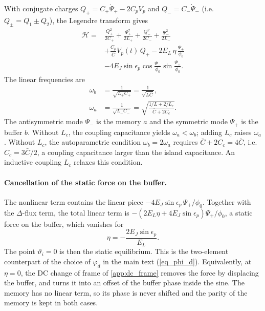 \documentclass[aps,prx,reprint,floatfix,amsmath,amssymb,longbibliography]{revtex4-2}
\begin{document}
With conjugate charges $Q_+=C_+\dot{\Psi}_+-2C_pV_p$ and
$Q_-=C_-\dot{\Psi}_-$ (i.e.\ $Q_\pm=Q_1\pm Q_2$), the Legendre transform
gives
\begin{equation}
\begin{aligned}
  \mathcal{H}={}&\frac{Q_+^2}{2C_+}+\frac{\Psi_+^2}{2L_+}
  +\frac{Q_-^2}{2C_-}+\frac{\Psi_-^2}{2L_-}\\
  &+\frac{C_p}{\bar{C}}V_p(t)\,Q_+
  -2E_L\,\eta\,\frac{\Psi_+}{\phi_0}\\
  &-4E_J\sin\epsilon_p\cos\frac{\Psi_-}{\phi_0}\sin\frac{\Psi_+}{\phi_0}.
\end{aligned}
\label{eq:app_H_bis}
\end{equation}
The linear frequencies are
\begin{equation}
\begin{aligned}
  \omega_b&=\frac{1}{\sqrt{L_+C_+}}=\frac{1}{\sqrt{L\bar{C}}},\\
  \omega_a&=\frac{1}{\sqrt{L_-C_-}}=\sqrt{\frac{1/L+2/L_c}{\bar{C}+2C_c}} .
\end{aligned}
\end{equation}
The antisymmetric mode $\Psi_-$ is the memory $a$ and the symmetric mode
$\Psi_+$ is the buffer $b$. Without $L_c$, the coupling capacitance
yields $\omega_a<\omega_b$; adding $L_c$ raises $\omega_a$. Without $L_c$,
the autoparametric condition $\omega_b=2\omega_a$ requires
$\bar{C}+2C_c=4\bar{C}$, i.e.\ $C_c=3\bar{C}/2$, a coupling capacitance
larger than the island capacitance. An inductive coupling $L_c$ relaxes
this condition.

\paragraph{Cancellation of the static force on the buffer.}
The nonlinear term contains the linear piece
$-4E_J\sin\epsilon_p\,\Psi_+/\phi_0$. Together with the $\Delta$-flux
term, the total linear term is
$-(2E_L\eta+4E_J\sin\epsilon_p)\Psi_+/\phi_0$, a static force on the
buffer, which vanishes for
\begin{equation}
  \eta=-\frac{2E_J\sin\epsilon_p}{E_L}.
  \label{eq:app_eta}
\end{equation}
The point $\vartheta_i=0$ is then the static equilibrium. This is the
two-element counterpart of the choice of $\varphi_d$ in the main text
(\cref{eq_phi_d}). Equivalently, at $\eta=0$, the DC change of frame of
\cref{app:dc_frame} removes the force by displacing the buffer, and turns it
into an offset of the buffer phase inside the sine. The memory has no linear
term, so its phase is never shifted and the parity of the memory is kept in
both cases.
\end{document}
